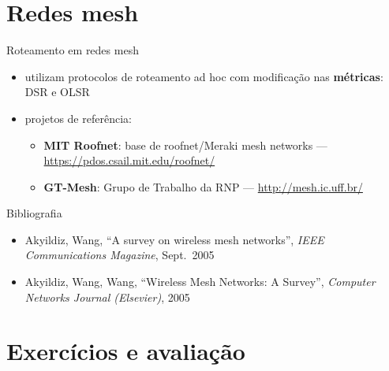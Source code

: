 \documentclass[aspectratio=169,11pt]{beamer}
\begin{document}
\section{Redes mesh}

\begin{frame}{Roteamento em redes mesh}
  \begin{itemize}
    \item utilizam protocolos de roteamento ad hoc com modificação nas \textbf{métricas}: DSR e OLSR
    \item projetos de referência:
      \begin{itemize}
        \item \textbf{MIT Roofnet}: base de roofnet/Meraki mesh networks --- \url{https://pdos.csail.mit.edu/roofnet/}
        \item \textbf{GT-Mesh}: Grupo de Trabalho da RNP --- \url{http://mesh.ic.uff.br/}
      \end{itemize}
  \end{itemize}
  \begin{block}{Bibliografia}
    \begin{itemize}
      \item Akyildiz, Wang, ``A survey on wireless mesh networks'', \emph{IEEE Communications Magazine}, Sept.~2005
      \item Akyildiz, Wang, Wang, ``Wireless Mesh Networks: A Survey'', \emph{Computer Networks Journal (Elsevier)}, 2005
    \end{itemize}
  \end{block}
\end{frame}

\section{Exercícios e avaliação}
\end{document}
